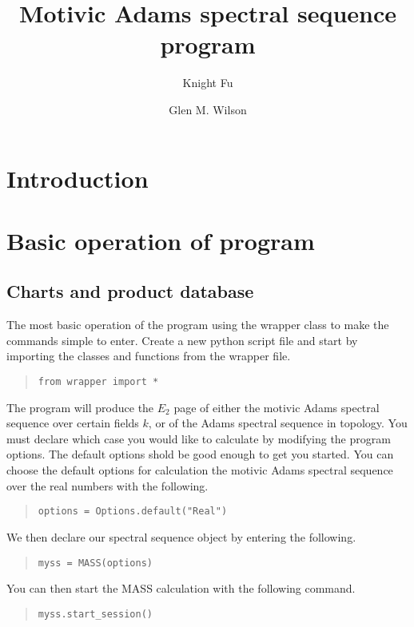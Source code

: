 \documentclass{article}
\begin{document}
\title{Motivic Adams spectral sequence program}
\author{Knight Fu \and Glen M. Wilson}

\maketitle


\section{Introduction}

\section{Basic operation of program}
\subsection{Charts and product database}

The most basic operation of the program using the wrapper class to
make the commands simple to enter. Create a new python script file and
start by importing the classes and functions from the wrapper file.

\begin{quote}
\begin{verbatim}
from wrapper import *
\end{verbatim}
\end{quote}

The program will produce the $E_2$ page of either the motivic Adams
spectral sequence over certain fields $k$, or of the Adams spectral
sequence in topology. You must declare which case you would like to
calculate by modifying the program options. The default options shold
be good enough to get you started. You can choose the default options
for calculation the motivic Adams spectral sequence over the real
numbers with the following.
\begin{quote}
\begin{verbatim}
options = Options.default("Real")
\end{verbatim}
\end{quote}

We then declare our spectral sequence object by entering the
following.
\begin{quote}
\begin{verbatim}
myss = MASS(options)
\end{verbatim}
\end{quote}
You can then start the MASS calculation with the following command.
\begin{quote}
\begin{verbatim}
myss.start_session()
\end{verbatim}
\end{quote}
\end{document}
